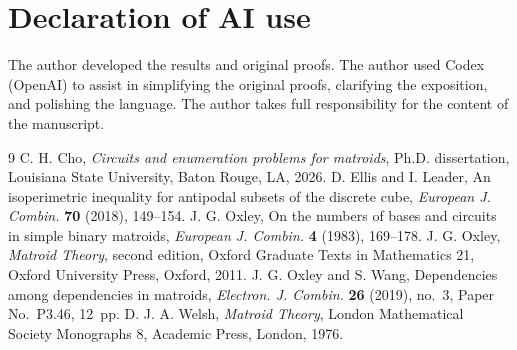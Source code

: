 \documentclass[11pt]{article}
\numberwithin{equation}{section}
\begin{document}
\section*{Declaration of AI use}
The author developed the results and original proofs.
The author used Codex (OpenAI) to assist in simplifying the original proofs, clarifying the exposition, and polishing the language.
The author takes full responsibility for the content of the manuscript.

\begin{thebibliography}{9}
\setlength{\itemsep}{2pt}
\setlength{\parsep}{0pt}
\setlength{\parskip}{0pt}
C. H. Cho,
\emph{Circuits and enumeration problems for matroids},
Ph.D. dissertation, Louisiana State University, Baton Rouge, LA, 2026.
D. Ellis and I. Leader,
An isoperimetric inequality for antipodal subsets of the discrete cube,
\emph{European J. Combin.} \textbf{70} (2018), 149--154.
J. G. Oxley,
On the numbers of bases and circuits in simple binary matroids,
\emph{European J. Combin.} \textbf{4} (1983), 169--178.
J. G. Oxley,
\emph{Matroid Theory}, second edition,
Oxford Graduate Texts in Mathematics 21,
Oxford University Press, Oxford, 2011.
J. G. Oxley and S. Wang,
Dependencies among dependencies in matroids,
\emph{Electron. J. Combin.} \textbf{26} (2019), no.~3, Paper No.~P3.46, 12~pp.
D. J. A. Welsh,
\emph{Matroid Theory},
London Mathematical Society Monographs 8,
Academic Press, London, 1976.
\end{thebibliography}
\end{document}
